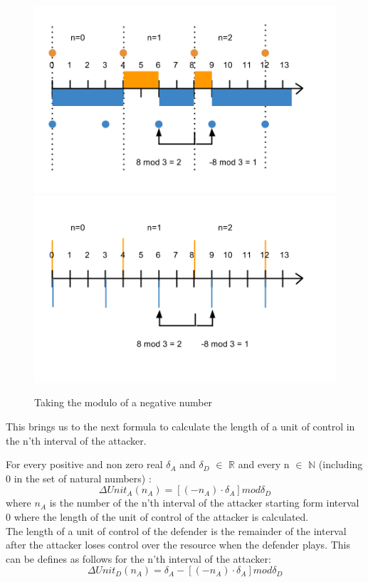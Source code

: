 \begin{figure}[hbtp]
\caption{Taking the modulo of a negative number}
\centering
\includegraphics[scale=0.4]{Images/modulotek}
\includegraphics[scale=0.4]{Images/Modulosimpel}
\label{fig:modulo}
\end{figure}


This brings us to the next formula to calculate the length of a unit of control in the n'th interval of the attacker. 

For every positive and non zero real $\delta_{A}$ and $\delta_{D}$ $\in$ \(\mathbb{R}\) and every n $\in$ \(\mathbb{N}\) (including 0 in the set of natural numbers) :
\begin{equation}\label{first}
\Delta Unit_{A}(n_{A}) =  [( - n_{A}  ) \cdot \delta_{A}] mod \delta_{D}
\end{equation}
where $n_{A}$ is the number of the n'th interval of the attacker starting form interval 0 where the length of the unit of control of the attacker is calculated.\\

The length of a unit of control of the defender is the remainder of the interval after the attacker loses control over the resource when the defender plays. This can be defines as follows for the n'th interval of the attacker:
\begin{equation}\label{first}
\Delta Unit_{D}(n_{A}) = \delta_{A} - [( - n_{A}  ) \cdot \delta_{A}] mod \delta_{D}
\end{equation}

